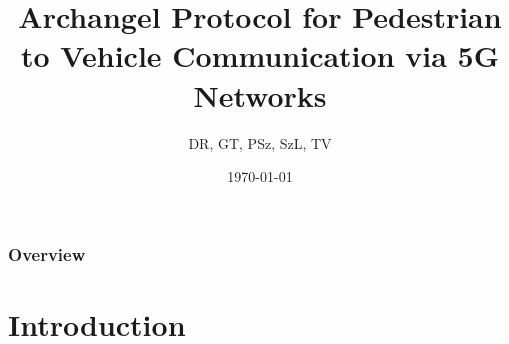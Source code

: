 \documentclass{beamer}
\title[Archangel Protocol]{Archangel Protocol for Pedestrian to Vehicle Communication via 5G Networks} %
\author{DR, GT, PSz, SzL, TV} %
\institute[ELTE] %
{
Eötvös Loránd University \\ %
\medskip
\textit{archangel@inf.elte.hu} %
}
\date{\today} %
\begin{document}
\begin{frame}
    \titlepage %
\end{frame}

\begin{frame}
    \frametitle{Overview} %
    \tableofcontents %
\end{frame}


\section{Introduction} %
\end{document}
